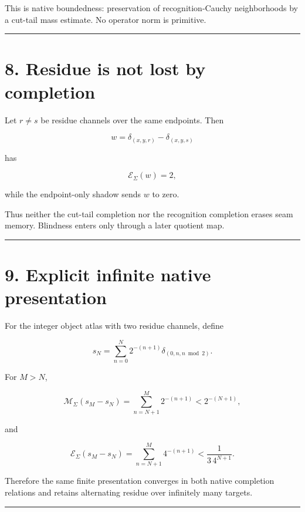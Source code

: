 This is native boundedness: preservation of recognition-Cauchy neighborhoods by
a cut-tail mass estimate. No operator norm is primitive.

\begin{center}\rule{0.5\linewidth}{0.5pt}\end{center}

\hypertarget{residue-is-not-lost-by-completion}{%
\section{8. Residue is not lost by completion}\label{residue-is-not-lost-by-completion}}

Let \(r\ne s\) be residue channels over the same endpoints. Then

\[
w=\delta_{(x,y,r)}-\delta_{(x,y,s)}
\]

has

\[
\mathcal E_\Sigma(w)=2,
\tag{8.1}
\]

while the endpoint-only shadow sends \(w\) to zero.

Thus neither the cut-tail completion nor the recognition completion erases seam
memory. Blindness enters only through a later quotient map.

\begin{center}\rule{0.5\linewidth}{0.5pt}\end{center}

\hypertarget{explicit-infinite-native-presentation}{%
\section{9. Explicit infinite native presentation}\label{explicit-infinite-native-presentation}}

For the integer object atlas with two residue channels, define

\[
s_N
=
\sum_{n=0}^{N}
2^{-(n+1)}
\delta_{(0,n,n\bmod2)}.
\tag{9.1}
\]

For \(M>N\),

\[
\mathcal M_\Sigma(s_M-s_N)
=
\sum_{n=N+1}^{M}2^{-(n+1)}
<2^{-(N+1)},
\tag{9.2}
\]

and

\[
\mathcal E_\Sigma(s_M-s_N)
=
\sum_{n=N+1}^{M}4^{-(n+1)}
<\frac{1}{3\,4^{N+1}}.
\tag{9.3}
\]

Therefore the same finite presentation converges in both native completion
relations and retains alternating residue over infinitely many targets.

\begin{center}\rule{0.5\linewidth}{0.5pt}\end{center}

